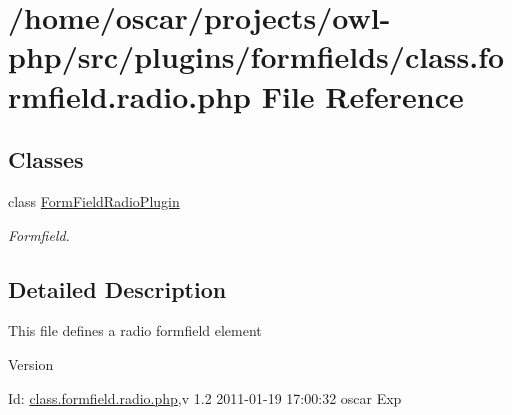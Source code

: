 \section{/home/oscar/projects/owl-\/php/src/plugins/formfields/class.formfield.radio.php File Reference}
\label{class_8formfield_8radio_8php}
\subsection*{Classes}
\begin{DoxyCompactItemize}
\item 
class \hyperlink{classFormFieldRadioPlugin}{FormFieldRadioPlugin}
\begin{DoxyCompactList}\small\item\em Formfield. \item\end{DoxyCompactList}\end{DoxyCompactItemize}


\subsection{Detailed Description}
This file defines a radio formfield element \begin{DoxyVersion}{Version}

\end{DoxyVersion}
\begin{DoxyParagraph}{Id:}
\hyperlink{class_8formfield_8radio_8php}{class.formfield.radio.php},v 1.2 2011-\/01-\/19 17:00:32 oscar Exp 
\end{DoxyParagraph}
